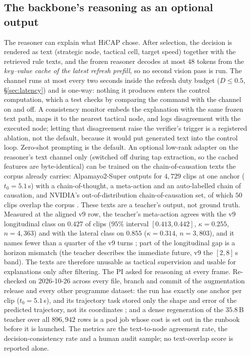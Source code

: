 \subsection{The backbone's reasoning as an optional output}\label{sec:explain}
The reasoner can explain what HiCAP chose. After selection, the decision is rendered as text (strategic node, tactical cell, target speed) together with the retrieved rule texts, and the frozen reasoner decodes at most $48$ tokens from the \emph{key--value cache of the latest refresh prefill}, so no second vision pass is run. The channel runs at most every two seconds inside the refresh duty budget ($D\le0.5$, \S\ref{sec:latency}) and is one-way: nothing it produces enters the control computation, which a test checks by comparing the command with the channel on and off. A consistency monitor embeds the explanation with the same frozen text path, maps it to the nearest tactical node, and logs disagreement with the executed node; letting that disagreement raise the verifier's trigger is a registered ablation, not the default, because it would put generated text into the control loop.
Zero-shot prompting is the default. An optional low-rank adapter on the reasoner's text channel only (switched off during tap extraction, so the cached features are byte-identical) can be trained on the chain-of-causation texts the corpus already carries: Alpamayo2-Super outputs for $4{,}729$ clips at one anchor ($t_0=5.1$\,s) with a chain-of-thought, a meta-action and an auto-labelled chain of causation, and NVIDIA's out-of-distribution chain-of-causation set, of which $50$ clips overlap the corpus \evM. These texts are a teacher's output, not ground truth. Measured at the aligned v9 row, the teacher's meta-action agrees with the v9 longitudinal class on $0.427$ of clips ($95\%$ interval $[0.413,0.442]$, $\kappa=0.255$, $n=4{,}363$) and with the lateral class on $0.855$ ($\kappa=0.314$, $n=3{,}803$), and it names fewer than a quarter of the v9 turns \evM; part of the longitudinal gap is a horizon mismatch (the teacher describes the immediate future, v9 the $[2,8]$\,s band). The texts are therefore unusable as tactical supervision and usable for explanations only after filtering. The PI asked for reasoning at every frame. Re-checked on 2026-10-26 across every file, branch and commit of the augmentation release and every other programme dataset: the run has exactly one anchor per clip ($t_0=5.1$\,s), and its trajectory task stored only the shape and error of the predicted trajectory, not its coordinates \evM; and a dense regeneration of the $35.8$\,B teacher over all $896{,}942$ rows is a pod job whose cost is set out in the runbook before it is launched. The metrics are the text-to-node agreement rate, the decision-consistency rate and a human audit sample; no text-overlap score is reported alone.

